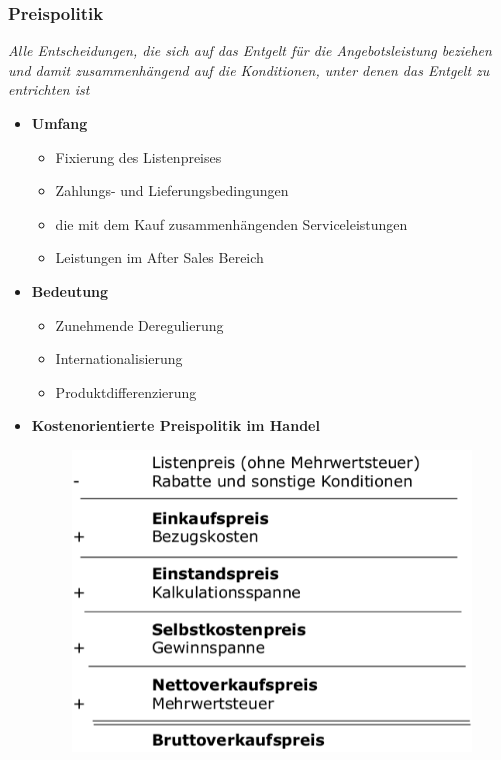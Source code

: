 \documentclass[a4paper,11pt, twoside]{article}
\begin{document}
\subsubsection*{Preispolitik}
\textit{Alle Entscheidungen, die sich auf das Entgelt für die Angebotsleistung beziehen und damit zusammenhängend auf die Konditionen, unter denen das Entgelt zu entrichten ist}
\begin{itemize}
	\item \textbf{Umfang}
\begin{itemize}
	\item Fixierung des Listenpreises
	\item Zahlungs- und Lieferungsbedingungen
	\item die mit dem Kauf zusammenhängenden Serviceleistungen
	\item Leistungen im After Sales Bereich
\end{itemize}

	\item \textbf{Bedeutung}
\begin{itemize}
	\item Zunehmende Deregulierung
	\item Internationalisierung
	\item Produktdifferenzierung
\end{itemize}

	\item \textbf{Kostenorientierte Preispolitik im Handel}
\begin{figure}[h]
 \begin{center}
   \includegraphics[scale=0.3]{bilder/kostenorientierte_preispolitik.png}
 \end{center}
\end{figure}
\newpage 


\end{itemize}
\end{document}
